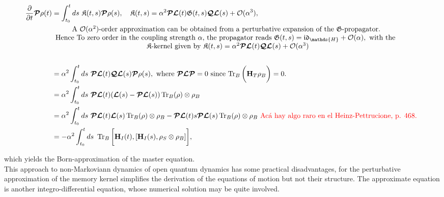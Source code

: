 \documentclass{homework}
\begin{document}
\begin{equation}
\begin{split}
    \frac{\partial}{\partial t} \bm{\mathcal{P}}\rho(t) &= \int_{t_0}^{t} ds \blanky \mathfrak{K}(t,s) \bm{\mathcal{P}} \rho(s), \quad \mathfrak{K}(t,s) = \alpha^2 \bm{\mathcal{P}} \bm{\mathcal{L}}(t) \mathfrak{G}({t},s) \bm{\mathcal{Q}} \bm{\mathcal{L}}(s) + \mathcal{O}(\alpha^3), \\
    & \begin{array}{cc}
         \textnormal{ A $\mathcal{O}(\alpha^2)$-order approximation can be obtained from a perturbative expansion of the $\mathfrak{G}$-propagator. }  \\
         \textnormal{Hence To zero order in the coupling strength $\alpha$, the propagator reads } \mathfrak{G}(t,s) = \mathfrak{i}\mathfrak{d}_{\mathds{H}} + \mathcal{O}(\alpha), \textnormal{ with the } \\
         \textnormal{ $\mathfrak{K}$-kernel given by } \mathfrak{K}(t,s) = \alpha^2 \bm{\mathcal{P}} \bm{\mathcal{L}}(t) \bm{\mathcal{Q}} \bm{\mathcal{L}}(s) + \mathcal{O}(\alpha^3) 
    \end{array}\\
    \\
    & = \alpha^2 \int_{t_0}^{t} ds \blanky \bm{\mathcal{P}} \bm{\mathcal{L}}(t) \bm{\mathcal{Q}} \bm{\mathcal{L}}(s) \bm{\mathcal{P}}\rho(s), \textnormal{ where $\bm{\mathcal{P}} \bm{\mathcal{L}} \bm{\mathcal{P}} = 0$ since $\Tr_{B} \bigg({\bf H}_T \rho_B \bigg) = 0$. } \\
    &= \alpha^2 \int_{t_0}^{t} ds \blanky \bm{\mathcal{P}} \bm{\mathcal{L}}(t) ( \bm{\mathcal{L}}(s) - \bm{\mathcal{P}} \bm{\mathcal{L}}(s)) \Tr_{B}(\rho) \otimes \rho_B \\
    &= \alpha^2 \int_{t_0}^{t} ds \blanky \bm{\mathcal{P}} \bm{\mathcal{L}}(t)  \bm{\mathcal{L}}(s) \Tr_{B}(\rho) \otimes \rho_B - \bm{\mathcal{P}} \bm{\mathcal{L}}(t)s \bm{\mathcal{P}} \bm{\mathcal{L}}(s) \Tr_{B}(\rho) \otimes \rho_B \textnormal{ \textcolor{red}{ Acá hay algo raro en el Heinz-Pettrucione, p. 468. }} \\
    &= -\alpha^2 \int_{t_0}^{t} ds \blanky \Tr_{B} \bigg[{\bf H}_I(t), [{\bf H}_I(s), \rho_S \otimes \rho_B]\bigg],
\end{split}
\end{equation}

which yields the Born-approximation of the master equation. \\

This approach to non-Markoviann dynamics of open quantum dynamics has some practical disadvantages, for the perturbative approximation of the memory kernel simplifies the derivation of the equations of motion but not their structure. The approximate equation is another integro-differential equation, whose numerical solution may be quite involved. \\
\end{document}
